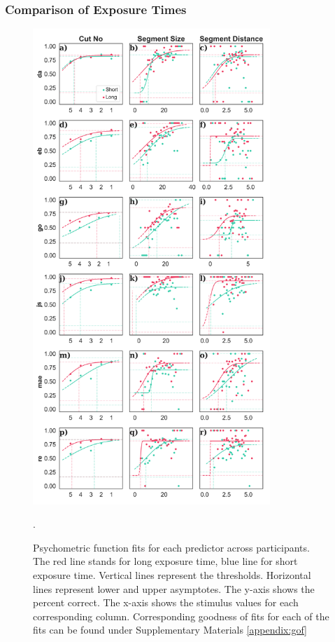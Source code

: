 \documentclass{article}
\begin{document}
\subsubsection{Comparison of Exposure Times}
\begin{figure}[!hb]
    \centering
    \vspace{-1cm}
    \includegraphics[width = 0.8\textwidth]{plots/psych_fits.png}
    \caption{Psychometric function fits for each predictor across participants. The red line stands for long exposure time, blue line for short exposure time. Vertical lines represent the thresholds. Horizontal lines represent lower and upper asymptotes. The y-axis shows the percent correct. The x-axis shows the stimulus values for each corresponding column. Corresponding goodness of fits for each of the fits can be found under Supplementary Materials  \ref{appendix:gof}}.
    \label{fig:psych_fits}
\end{figure}
\end{document}
